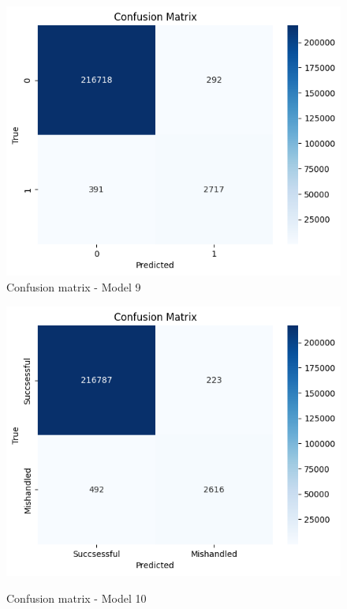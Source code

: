 \documentclass[12pt]{article}
\begin{document}
\begin{figure}
\begin{minipage}[c]{0.45\linewidth}
\includegraphics[width=1\textwidth]{Confusion_matrix_Model 9.png}\\
\caption{Confusion matrix - Model 9}
\end{minipage}
\hfill
\begin{minipage}[c]{0.45\linewidth}
    \includegraphics[width=1\textwidth]{Confusion_matrix_Model 10.png}\\
    \caption{Confusion matrix - Model 10}
\end{minipage}%
\end{figure}
\end{document}
